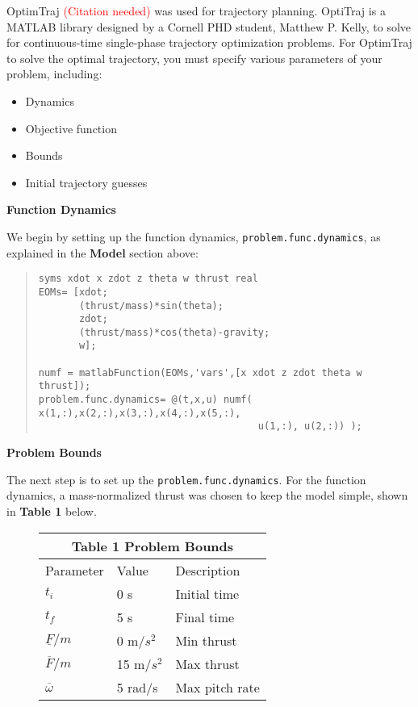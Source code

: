 \documentclass[12pt]{article}
\begin{document}
OptimTraj \textcolor{red}{(Citation needed)} was used for trajectory planning. OptiTraj is a MATLAB library designed by a Cornell PHD student, Matthew P. Kelly, to solve for continuous-time single-phase trajectory optimization problems. For OptimTraj to solve the optimal trajectory, you must specify various parameters of your problem, including:
\begin{itemize}
  \item Dynamics
  \item Objective function
  \item Bounds
  \item Initial trajectory guesses
\end{itemize}

\begin{flushleft}
{\Large \textbf{\textbf{Function Dynamics}} }
\end{flushleft}
We begin by setting up the function dynamics, \lstinline!problem.func.dynamics!, as explained in the \textbf{Model} section above: 
\begin{quote}
\begin{lstlisting}
syms xdot x zdot z theta w thrust real
EOMs= [xdot;
       (thrust/mass)*sin(theta);
       zdot;
       (thrust/mass)*cos(theta)-gravity;
       w];

numf = matlabFunction(EOMs,'vars',[x xdot z zdot theta w thrust]);
problem.func.dynamics= @(t,x,u) numf( x(1,:),x(2,:),x(3,:),x(4,:),x(5,:),
                                      u(1,:), u(2,:)) );

\end{lstlisting}
\end{quote}

\begin{flushleft}
{\Large \textbf{\textbf{Problem Bounds}} }
\end{flushleft}

The next step is to set up the \lstinline!problem.func.dynamics!. For the function dynamics, a mass-normalized thrust was chosen to keep the model simple, shown in \textbf{Table 1} below. 

\begin{figure}[H]
\begin{center}
\begin{tabular}{ |p{2.5cm}||p{2cm}||p{3cm}| }
 \hline
 \multicolumn{3}{|c|}{\textbf{Table 1}   Problem Bounds} \\
 \hline
 Parameter & Value & Description\\
 \hline
 $t_{i}$   & 0 s  & Initial time\\
 $t_{f}$  & 5 s  & Final time\\
 $\underline{F}/m$ & 0 m/$s^{2}$ & Min thrust\\
 $\overline{F}/m$ & 15 m/$s^{2}$ & Max thrust\\
 $\overline{\omega}$ & 5 rad/s & Max pitch rate \\
 \hline
\end{tabular}
\end{center}
\end{figure}
\end{document}
